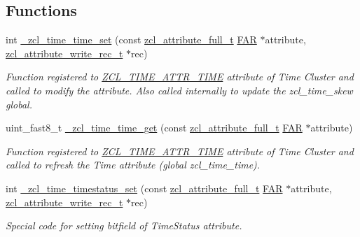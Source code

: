 \subsection*{Functions}
\begin{DoxyCompactItemize}
\item 
int \hyperlink{group__zcl__time_ga052b988d6d2448af6640028b45ee1f68}{\+\_\+zcl\+\_\+time\+\_\+time\+\_\+set} (const \hyperlink{structzcl__attribute__full__t}{zcl\+\_\+attribute\+\_\+full\+\_\+t} \hyperlink{group__hal_gaef060b3456fdcc093a7210a762d5f2ed}{F\+AR} $\ast$attribute, \hyperlink{structzcl__attribute__write__rec__t}{zcl\+\_\+attribute\+\_\+write\+\_\+rec\+\_\+t} $\ast$rec)
\begin{DoxyCompactList}\small\item\em Function registered to \hyperlink{group__zcl__time_ga6abf0e2cc70ac533ebe153a40185be63}{Z\+C\+L\+\_\+\+T\+I\+M\+E\+\_\+\+A\+T\+T\+R\+\_\+\+T\+I\+ME} attribute of Time Cluster and called to modify the attribute. Also called internally to update the zcl\+\_\+time\+\_\+skew global. \end{DoxyCompactList}\item 
uint\+\_\+fast8\+\_\+t \hyperlink{group__zcl__time_ga9c0749b71318a4f7fd28d9112ffd5462}{\+\_\+zcl\+\_\+time\+\_\+time\+\_\+get} (const \hyperlink{structzcl__attribute__full__t}{zcl\+\_\+attribute\+\_\+full\+\_\+t} \hyperlink{group__hal_gaef060b3456fdcc093a7210a762d5f2ed}{F\+AR} $\ast$attribute)
\begin{DoxyCompactList}\small\item\em Function registered to \hyperlink{group__zcl__time_ga6abf0e2cc70ac533ebe153a40185be63}{Z\+C\+L\+\_\+\+T\+I\+M\+E\+\_\+\+A\+T\+T\+R\+\_\+\+T\+I\+ME} attribute of Time Cluster and called to refresh the Time attribute (global zcl\+\_\+time\+\_\+time). \end{DoxyCompactList}\item 
int \hyperlink{group__zcl__time_ga1b55e2dc0a4e0752c92dda9b65d349d2}{\+\_\+zcl\+\_\+time\+\_\+timestatus\+\_\+set} (const \hyperlink{structzcl__attribute__full__t}{zcl\+\_\+attribute\+\_\+full\+\_\+t} \hyperlink{group__hal_gaef060b3456fdcc093a7210a762d5f2ed}{F\+AR} $\ast$attribute, \hyperlink{structzcl__attribute__write__rec__t}{zcl\+\_\+attribute\+\_\+write\+\_\+rec\+\_\+t} $\ast$rec)
\begin{DoxyCompactList}\small\item\em Special code for setting bitfield of Time\+Status attribute. \end{DoxyCompactList}\item 

\end{DoxyCompactItemize}
